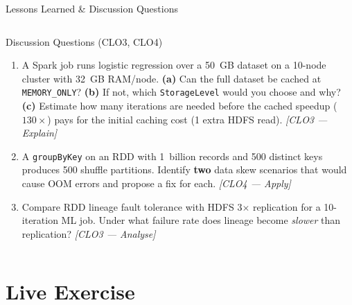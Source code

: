 \documentclass[aspectratio=169,10pt]{beamer}
\begin{document}
\begin{frame}{Lessons Learned \& Discussion Questions}
\begin{columns}[T]
      \begin{alertblock}{Discussion Questions \textmd{\tiny (CLO3, CLO4)}}
        \begin{enumerate}
          \item A Spark job runs logistic regression over a 50~GB dataset
                on a 10-node cluster with 32~GB RAM/node.
                \textbf{(a)} Can the full dataset be cached at
                \texttt{MEMORY\_ONLY}?  \textbf{(b)} If not, which
                \texttt{StorageLevel} would you choose and why?
                \textbf{(c)} Estimate how many iterations are needed
                before the cached speedup ($130\times$) pays for the
                initial caching cost (1 extra HDFS read).
                \textit{[CLO3 — Explain]}
          \item A \texttt{groupByKey} on an RDD with 1~billion records
                and 500 distinct keys produces 500 shuffle partitions.
                Identify \textbf{two} data skew scenarios that would
                cause OOM errors and propose a fix for each.
                \textit{[CLO4 — Apply]}
          \item Compare RDD lineage fault tolerance with HDFS
                3$\times$ replication for a 10-iteration ML job.
                Under what failure rate does lineage become \emph{slower}
                than replication?
                \textit{[CLO3 — Analyse]}
        \end{enumerate}
      \end{alertblock}
  \end{columns}
\end{frame}

\section{Live Exercise}
\end{document}
